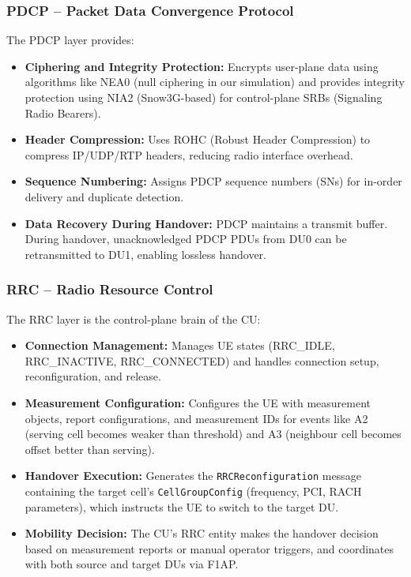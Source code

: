 \subsubsection{PDCP -- Packet Data Convergence Protocol}
The PDCP layer provides:
\begin{itemize}
    \item \textbf{Ciphering and Integrity Protection:} Encrypts user-plane data using algorithms like NEA0 (null ciphering in our simulation) and provides integrity protection using NIA2 (Snow3G-based) for control-plane SRBs (Signaling Radio Bearers).
    \item \textbf{Header Compression:} Uses ROHC (Robust Header Compression) to compress IP/UDP/RTP headers, reducing radio interface overhead.
    \item \textbf{Sequence Numbering:} Assigns PDCP sequence numbers (SNs) for in-order delivery and duplicate detection.
    \item \textbf{Data Recovery During Handover:} PDCP maintains a transmit buffer. During handover, unacknowledged PDCP PDUs from DU0 can be retransmitted to DU1, enabling lossless handover.
\end{itemize}

\subsubsection{RRC -- Radio Resource Control}
The RRC layer is the control-plane brain of the CU:
\begin{itemize}
    \item \textbf{Connection Management:} Manages UE states (RRC\_IDLE, RRC\_INACTIVE, RRC\_CONNECTED) and handles connection setup, reconfiguration, and release.
    \item \textbf{Measurement Configuration:} Configures the UE with measurement objects, report configurations, and measurement IDs for events like A2 (serving cell becomes weaker than threshold) and A3 (neighbour cell becomes offset better than serving).
    \item \textbf{Handover Execution:} Generates the \texttt{RRCReconfiguration} message containing the target cell's \texttt{CellGroupConfig} (frequency, PCI, RACH parameters), which instructs the UE to switch to the target DU.
    \item \textbf{Mobility Decision:} The CU's RRC entity makes the handover decision based on measurement reports or manual operator triggers, and coordinates with both source and target DUs via F1AP.
\end{itemize}

